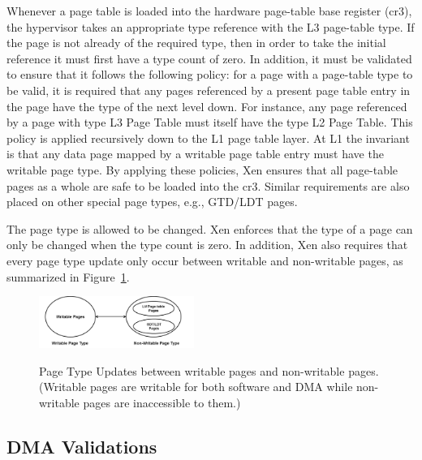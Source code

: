 Whenever a page table is loaded into the hardware page-table base register (cr3),
the hypervisor takes an appropriate type reference with the L3 page-table type.
If the page is not already of the required type, then in order to take the initial reference it must first have a type count of zero.
In addition, it must be validated to ensure that it follows the following policy:
for a page with a page-table type to be valid, it is required that any pages referenced
by a present page table entry in the page have the type of the next level down.
For instance, any page referenced by a page with type L3 Page Table must itself have the type L2 Page Table.
This policy is applied recursively down to the L1 page table layer.
At L1 the invariant is that any data page mapped by a writable page table entry must have the writable page type.
By applying these policies, Xen ensures that all page-table pages as a whole are safe to be loaded into the cr3.
Similar requirements are also placed on other special page types, e.g., GTD/LDT pages.

The page type is allowed to be changed.
Xen enforces that the type of a page can only be changed when the type count is zero.
In addition, Xen also requires that every page type update only occur between writable and non-writable pages, as summarized in Figure~\ref{fig:page-type-updates}.

\begin{figure}[ht]
\centering
\includegraphics[width=0.45\textwidth]{image/background/page-type-updates.png} \\
\caption{Page Type Updates between writable pages and non-writable pages. (Writable pages are writable for both software and DMA
while non-writable pages are inaccessible to them.)}
\label{fig:page-type-updates}
\end{figure}


\subsection{DMA Validations}

